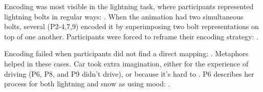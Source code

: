    Encoding %
   was most visible in the lightning task, where participants represented lightning bolts in regular ways: %
   .
   When the animation had two simultaneous bolts, several (P2-4,7,9) encoded it by superimposing two bolt representations on top of one another.
   Participants were forced to reframe their encoding strategy:
   .
   
   
   Encoding failed when participants did not find a direct mapping:
      . %
   Metaphors helped in these cases.
   Car took extra imagination, either for the experience of driving (P6, P8, and P9 didn't drive), %
   or because it's hard to %
   . %
   P6 describes her process for both lightning and snow as using mood: .
   

